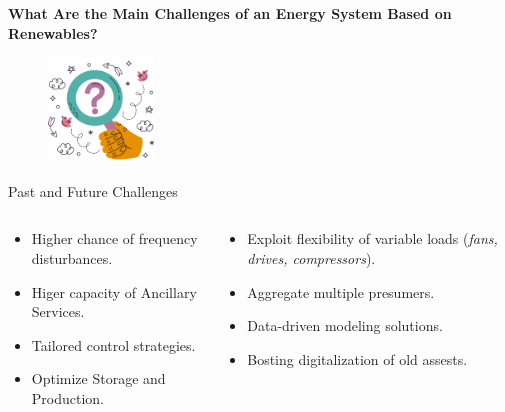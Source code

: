 \documentclass[aspectratio=169,hyperref={pdfpagelabels=false}]{beamer}
\begin{document}
\begin{frame}{}
  \begin{center}
  \Large{\textbf{What Are the Main Challenges of an Energy System Based on Renewables?}}
  \end{center}
  \vspace{1em}
  \begin{figure}[t]
    \includegraphics[width=0.25\textwidth]{img/pic5.png} \centering
    \centering
    \end{figure}
  
\end{frame}
        
\begin{frame}{\Large{Past and Future Challenges}}
  \begin{columns}
    \begin{column}{0.5\textwidth}
      \begin{itemize}
        \item Higher chance of frequency disturbances. 
        \item Higer capacity of Ancillary Services. 
        \item Tailored control strategies. 
        \item Optimize Storage and Production. \pause
      \end{itemize}
    \end{column}

    \begin{column}{0.5\textwidth}
      \begin{itemize}
        \item Exploit flexibility of variable loads (\textit{fans, drives, compressors}). 
        \item Aggregate multiple presumers.
        \item Data-driven modeling solutions. 
        \item Bosting digitalization of old assests. 
      \end{itemize}
    \end{column}
  \end{columns}
\end{frame}
\end{document}
